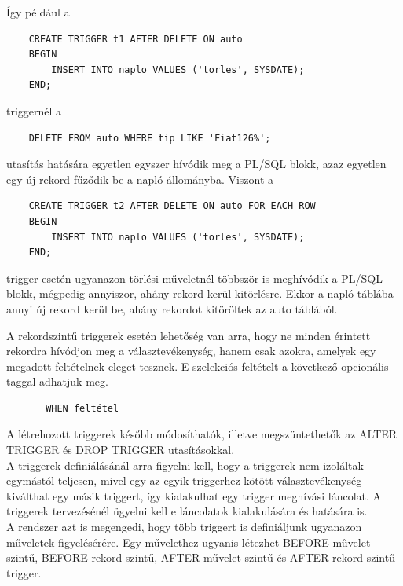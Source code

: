 \documentclass[tikz,12pt,margin=0px]{article}
\begin{document}
    \noindent Így például a
    \begin{verbatim}
    CREATE TRIGGER t1 AFTER DELETE ON auto
    BEGIN
        INSERT INTO naplo VALUES ('torles', SYSDATE);
    END;
    \end{verbatim}
    \noindent triggernél a
    \begin{verbatim}
    DELETE FROM auto WHERE tip LIKE 'Fiat126%';
    \end{verbatim}
    utasítás hatására egyetlen egyszer hívódik meg a PL/SQL blokk, azaz egyetlen egy új rekord fűződik be a napló állományba. Viszont a
    \begin{verbatim}
    CREATE TRIGGER t2 AFTER DELETE ON auto FOR EACH ROW
    BEGIN
        INSERT INTO naplo VALUES ('torles', SYSDATE);
    END;
    \end{verbatim}
    trigger esetén ugyanazon törlési műveletnél többször is meghívódik a PL/SQL blokk, mégpedig annyiszor, ahány rekord kerül kitörlésre. Ekkor a napló táblába annyi új rekord kerül be, ahány rekordot kitöröltek az auto táblából.

    \noindent A rekordszintű triggerek esetén lehetőség van arra, hogy ne minden érintett rekordra hívódjon meg a választevékenység, hanem csak azokra, amelyek egy megadott feltételnek eleget tesznek. E szelekciós feltételt a következő opcionális taggal adhatjuk meg.
    \begin{verbatim}
	   WHEN feltétel
    \end{verbatim}

    \noindent A létrehozott triggerek később módosíthatók, illetve megszüntethetők az ALTER TRIGGER és DROP TRIGGER utasításokkal.\\

    \noindent A triggerek definiálásánál arra figyelni kell, hogy a triggerek nem izoláltak egymástól teljesen, mivel egy az egyik triggerhez kötött választevékenység kiválthat egy másik triggert, így kialakulhat egy trigger meghívási láncolat. A triggerek tervezésénél ügyelni kell e láncolatok kialakulására és hatására is.\\

    \noindent A rendszer azt is megengedi, hogy több triggert is definiáljunk ugyanazon műveletek figyelésérére. Egy művelethez ugyanis létezhet BEFORE művelet szintű, BEFORE rekord szintű, AFTER művelet szintű és AFTER rekord szintű trigger.\\
\end{document}
